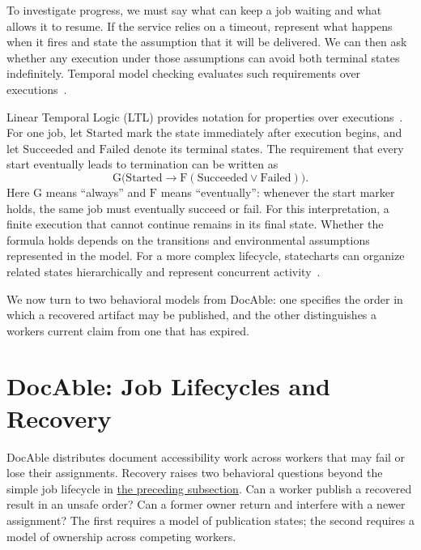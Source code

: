 
To investigate progress, we must say what can keep a job waiting and what allows it to resume. If the service relies on a timeout, represent what happens when it fires and state the assumption that it will be delivered. We can then ask whether any execution under those assumptions can avoid both terminal states indefinitely. Temporal model checking evaluates such requirements over executions~\citep{baier-katoen2008}.

Linear Temporal Logic (LTL) provides notation for properties over executions~\citep{baier-katoen2008}. For one job, let \(\mathrm{Started}\) mark the state immediately after execution begins, and let \(\mathrm{Succeeded}\) and \(\mathrm{Failed}\) denote its terminal states. The requirement that every start eventually leads to termination can be written as
\[
\mathrm{G}\bigl(\mathrm{Started}\rightarrow\mathrm{F}(\mathrm{Succeeded}\lor\mathrm{Failed})\bigr).
\]
Here \(\mathrm{G}\) means ``always'' and \(\mathrm{F}\) means ``eventually'': whenever the start marker holds, the same job must eventually succeed or fail. For this interpretation, a finite execution that cannot continue remains in its final state. Whether the formula holds depends on the transitions and environmental assumptions represented in the model. For a more complex lifecycle, statecharts can organize related states hierarchically and represent concurrent activity~\citep{harel1987}.

We now turn to two behavioral models from DocAble: one specifies the order in which a recovered artifact may be published, and the other distinguishes a worker\textquotesingle s current claim from one that has expired.

\section{DocAble: Job Lifecycles and Recovery}\label{heading:docable-job-lifecycles-and-recovery}

DocAble distributes document accessibility work across workers that may fail or lose their assignments. Recovery raises two behavioral questions beyond the simple job lifecycle in \hyperref[2.4-behavioral:heading:states-transitions-and-behavioral-analysis]{the preceding subsection}. Can a worker publish a recovered result in an unsafe order? Can a former owner return and interfere with a newer assignment? The first requires a model of publication states; the second requires a model of ownership across competing workers.

